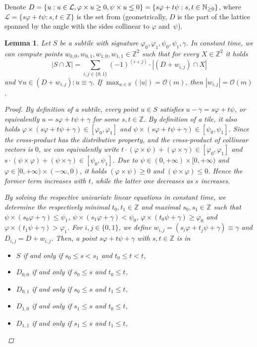 \documentclass[11pt, letterpaper]{article}
\theoremstyle{plain}
\newtheorem{lemma}{Lemma}
\theoremstyle{definition}
\theoremstyle{remark}
\renewcommand{\O}{\mathcal{O}}
\renewcommand{\L}{\mathcal{L}}
\renewcommand{\phi}{\varphi}
\newcommand{\set}[1]{\left\lbrace #1 \right\rbrace}
\newcommand{\absolute}[1]{\left\lvert#1\right\rvert}
\begin{document}
Denote $D = \set{u : u \in \L, \h{u} \ge 0, \s{u} \le 0} = \{ s\phi + t\psi : s,t \in \mathbb N_{\geq 0}\}$, where $\L = \{ s\phi + t\psi : s,t \in \mathbb Z\}$ is the set from  (geometrically, $D$ is the part of the lattice spanned by the angle with the sides collinear to $\phi$ and~$\psi$).

\begin{lemma}\label{primitive}
Let $S$ be a subtile with signature $\phi_0, \phi_1, \psi_0, \psi_1, \gamma$. In constant time, we can compute points $w_{0,0},w_{0,1},w_{1,0},w_{1,1} \in \mathbb Z^2$ such that for every $X \in \mathbb Z^2$ it holds
\[ \absolute{S \cap X} = \sum_{i,j \in \{0,1\}} (-1)^{(i+j)} \cdot \absolute{(D + w_{i,j}) \cap X}\]
and $\forall u \in (D + w_{i,j}) : u \equiv \gamma$. If $\max_{u \in S}(\absolute{u}) = \O(m)$, then $\absolute{w_{i,j}} = \O(m)$.

\begin{proof}
By definition of a subtile, every point $u \in S$ satisfies $u - \gamma = s\phi + t\psi$, or equivalently $u = s\phi + t\psi + \gamma$ for some $s,t\in\mathbb Z$. 
By definition of a tile, it also holds $\phi \times (s\phi + t\psi + \gamma) \in [\phi_0, \phi_1]$ and $\psi \times (s\phi + t\psi + \gamma) \in [\psi_0, \psi_1]$. Since the cross-product has the distributive property, and the cross-product of collinear vectors is $0$, we can equivalently write $t \cdot (\phi \times \psi) + (\phi \times \gamma) \in [\phi_0, \phi_1]$ and $s \cdot (\psi \times \phi) + (\psi \times \gamma) \in [\psi_0, \psi_1]$. 
Due to $\psi \in (0, +\infty) \times [0, +\infty)$ and $\phi \in [0, +\infty) \times (-\infty, 0)$, it holds $(\phi \times \psi) \geq 0$ and $(\psi \times \phi) \leq 0$. Hence the former term increases with $t$, while the latter one decreases as $s$ increases.

By solving the respective univariate linear equations in constant time, we determine the respectively minimal $t_0, t_1 \in \mathbb Z$ and maximal $s_0, s_1 \in \mathbb Z$ such that $\psi \times (s_0\phi + \gamma) \leq \psi_1$, $\psi \times (s_1\phi + \gamma) < \psi_0$, $\phi \times (t_0\psi + \gamma) \geq \phi_0$ and $\phi \times (t_1\psi + \gamma) > \phi_1$.
For $i,j \in \{0, 1\}$, we define $w_{i, j} = (s_i\phi + t_j\psi + \gamma) \equiv \gamma$ and $D_{i,j} = D + w_{i,j}$. 
Then, a point $s\phi + t\psi + \gamma$ with $s,t \in \mathbb Z$ is in 
\begin{itemize}
	\item $S$ if and only if $s_0 \leq s < s_1$ and $t_0 \leq t < t$,
	\item $D_{0, 0}$ if and only if $s_0 \leq s$ and $t_0 \leq t$,
	\item $D_{0, 1}$ if and only if $s_0 \leq s$ and $t_1 \leq t$,
	\item $D_{1, 0}$ if and only if $s_1 \leq s$ and $t_0 \leq t$,
	\item $D_{1, 1}$ if and only if $s_1 \leq s$ and $t_1 \leq t$,%
	~~~~~~~~\begin{tikzpicture}[overlay, x=.6em, y=.6em]


\end{tikzpicture}
\end{itemize}
\end{proof}
\end{lemma}
\end{document}
